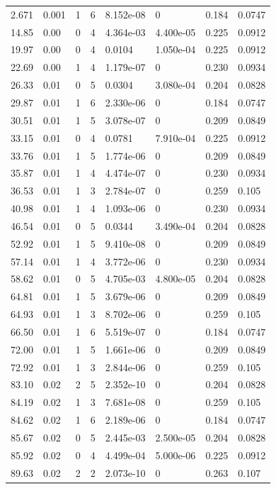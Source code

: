 \documentclass[preview]{standalone}
\begin{document}
{{\begin{tabular}{L{1.2cm}C{1.2cm} C{0.3cm}C{0.5cm} C{1.4cm}C{1.4cm} C{1.4cm}C{1.4cm}}
  2.671  &  0.001  & 1     &  6 &  8.152e-08  & 0  & 0.184 &  0.0747   \\ 
  14.85  &  0.00  & 0     &  4 &  4.364e-03  & 4.400e-05  & 0.225 &  0.0912   \\ 
  19.97  &  0.00  & 0     &  4 &  0.0104  & 1.050e-04  & 0.225 &  0.0912   \\ 
  22.69  &  0.00  & 1     &  4 &  1.179e-07  & 0  & 0.230 &  0.0934   \\ 
  26.33  &  0.01  & 0     &  5 &  0.0304  & 3.080e-04  & 0.204 &  0.0828   \\ 
  29.87  &  0.01  & 1     &  6 &  2.330e-06  & 0  & 0.184 &  0.0747   \\ 
  30.51  &  0.01  & 1     &  5 &  3.078e-07  & 0  & 0.209 &  0.0849   \\ 
  33.15  &  0.01  & 0     &  4 &  0.0781  & 7.910e-04  & 0.225 &  0.0912   \\ 
  33.76  &  0.01  & 1     &  5 &  1.774e-06  & 0  & 0.209 &  0.0849   \\ 
  35.87  &  0.01  & 1     &  4 &  4.474e-07  & 0  & 0.230 &  0.0934   \\ 
  36.53  &  0.01  & 1     &  3 &  2.784e-07  & 0  & 0.259 &  0.105   \\ 
  40.98  &  0.01  & 1     &  4 &  1.093e-06  & 0  & 0.230 &  0.0934   \\ 
  46.54  &  0.01  & 0     &  5 &  0.0344  & 3.490e-04  & 0.204 &  0.0828   \\ 
  52.92  &  0.01  & 1     &  5 &  9.410e-08  & 0  & 0.209 &  0.0849   \\ 
  57.14  &  0.01  & 1     &  4 &  3.772e-06  & 0  & 0.230 &  0.0934   \\ 
  58.62  &  0.01  & 0     &  5 &  4.705e-03  & 4.800e-05  & 0.204 &  0.0828   \\ 
  64.81  &  0.01  & 1     &  5 &  3.679e-06  & 0  & 0.209 &  0.0849   \\ 
  64.93  &  0.01  & 1     &  3 &  8.702e-06  & 0  & 0.259 &  0.105   \\ 
  66.50  &  0.01  & 1     &  6 &  5.519e-07  & 0  & 0.184 &  0.0747   \\ 
  72.00  &  0.01  & 1     &  5 &  1.661e-06  & 0  & 0.209 &  0.0849   \\ 
  72.92  &  0.01  & 1     &  3 &  2.844e-06  & 0  & 0.259 &  0.105   \\ 
  83.10  &  0.02  & 2     &  5 &  2.352e-10  & 0  & 0.204 &  0.0828   \\ 
  84.19  &  0.02  & 1     &  3 &  7.681e-08  & 0  & 0.259 &  0.105   \\ 
  84.62  &  0.02  & 1     &  6 &  2.189e-06  & 0  & 0.184 &  0.0747   \\ 
  85.67  &  0.02  & 0     &  5 &  2.445e-03  & 2.500e-05  & 0.204 &  0.0828   \\ 
  85.92  &  0.02  & 0     &  4 &  4.499e-04  & 5.000e-06  & 0.225 &  0.0912   \\ 
  89.63  &  0.02  & 2     &  2 &  2.073e-10  & 0  & 0.263 &  0.107   \\ 
\hline 
\end{tabular} 

}}
\end{document}
